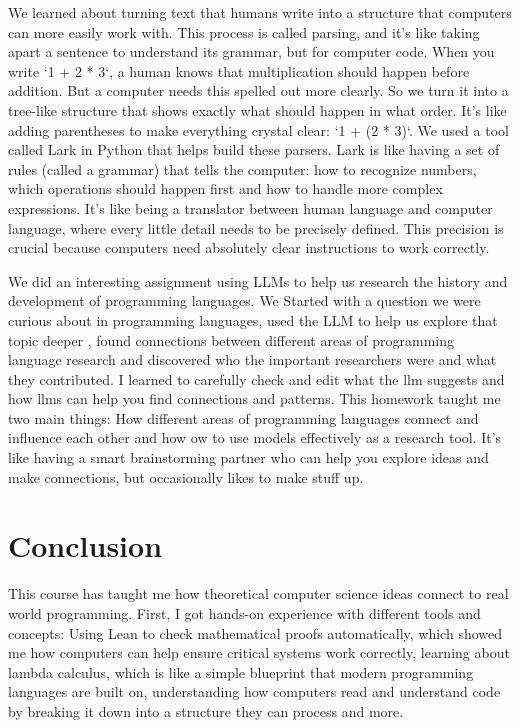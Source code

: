 \documentclass{article}
\theoremstyle{theorem}
\theoremstyle{definition}
\theoremstyle{remark}
\begin{document}
We learned about turning text that humans write into a structure that computers can more easily work with. This process is called parsing, 
and it's like taking apart a sentence to understand its grammar, but for computer code. When you write `1 + 2 * 3`, a human knows that 
multiplication should happen before addition. But a computer needs this spelled out more clearly. So we turn it into a tree-like structure 
that shows exactly what should happen in what order. It's like adding parentheses to make everything crystal clear: `1 + (2 * 3)`.
We used a tool called Lark in Python that helps build these parsers. Lark is like having a set of rules (called a grammar) that tells the computer: 
how to recognize numbers, which operations should happen first and how to handle more complex expressions. It's like being a translator between 
human language and computer language, where every little detail needs to be precisely defined. This precision is crucial because computers 
need absolutely clear instructions to work correctly.


We did an interesting assignment using LLMs to help us research the history and development of programming languages. 
We Started with a question we were curious about in programming languages, used the LLM to help us explore that topic deeper
, found connections between different areas of programming language research and discovered who the important researchers were and 
what they contributed. I learned to carefully check and edit what the llm suggests and how llms can help you find connections and patterns. 
This homework taught me two main things: How different areas of programming languages connect and influence each other
and how ow to use models effectively as a research tool. It's like having a smart brainstorming partner who can help you explore ideas and 
make connections, but occasionally likes to make stuff up. 


\section{Conclusion}\label{conclusion}


This course has taught me how theoretical computer science ideas connect to real world programming.
First, I got hands-on experience with different tools and concepts:
Using Lean to check mathematical proofs automatically, which showed me how computers can help ensure critical systems work correctly,
learning about lambda calculus, which is like a simple blueprint that modern programming languages are built on, 
understanding how computers read and understand code by breaking it down into a structure they can process and more. 
\end{document}
